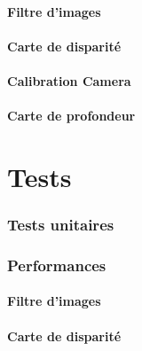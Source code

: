 \documentclass{article}
\begin{document}
\subsection{Filtre d'images}


\newpage
\subsection{Carte de disparité}


\newpage
\subsection{Calibration Camera}


\newpage
\subsection{Carte de profondeur}

\newpage
\part{Tests}

\section{Tests unitaires}

\section{Performances}

\subsection{Filtre d'images}


\subsection{Carte de disparité}
\end{document}
